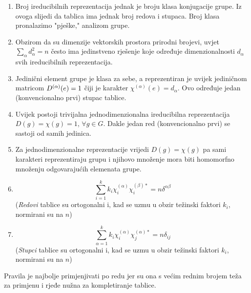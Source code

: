 \begin{enumerate}

\item Broj ireducibilnih reprezentacija jednak je broju klasa konjugacije 
  grupe. Iz ovoga slijedi da tablica ima jednak broj redova i stupaca. 
  Broj klasa pronalazimo "pješke," analizom grupe.

\item Obzirom  da su dimenzije vektorskih prostora prirodni brojevi,
    uvjet $\sum_{\alpha} d_{\alpha}^2 = n$ često ima jedinstveno rješenje koje
    određuje dimenzionalnosti $d_{\alpha}$ svih ireducibilnih reprezentacija.

\item Jedinični element grupe je klasa za sebe, a reprezentiran je uvijek
  jediničnom matricom $D^{(\alpha)}(e)=1$ čiji je 
   karakter $\chi^{(\alpha)}(e)=d_{\alpha}$.
  Ovo određuje jedan (konvencionalno prvi) stupac tablice.

\item Uvijek postoji trivijalna jednodimenzionalna ireducibilna
   reprezentacija  $D(g)=\chi(g)=1$, $\forall g\in G$.
  Dakle jedan red (konvencionalno prvi) se sastoji od samih jedinica.

\item Za jednodimenzionalne reprezentacije vrijedi $D(g)=\chi(g)$ pa
  sami karakteri reprezentiraju grupu i njihovo množenje mora biti
  homomorfno množenju odgovarajućih elemenata grupe.

\item  \[\sum_{i=1}^{k} k_{i} \chi^{(\alpha)}_{i} \chi^{(\beta) *}_{i} =
    n \delta^{\alpha\beta}\] 
(\emph{Redovi} tablice su ortogonalni i, kad se uzmu u obzir težinski
  faktori $k_i$, normirani su na $n$)

\item  \[\sum_{\alpha=1}^{k} k_{i} \chi^{(\alpha)}_{i} \chi^{(\alpha) *}_{j} =
    n \delta_{ij} \] 
(\emph{Stupci} tablice su ortogonalni i, kad se uzmu u obzir težinski
  faktori $k_i$, normirani su na $n$)

\end{enumerate}

Pravila je najbolje primjenjivati po redu jer su ona s većim rednim
brojem teža za primjenu i rjeđe nužna za kompletiranje tablice.


